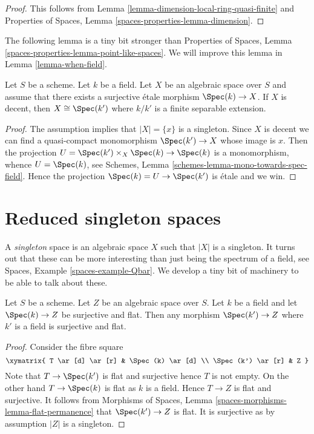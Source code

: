 \begin{proof}
This follows from Lemma \ref{lemma-dimension-local-ring-quasi-finite}
and Properties of Spaces, Lemma \ref{spaces-properties-lemma-dimension}.
\end{proof}

\noindent
The following lemma is a tiny bit stronger than
Properties of Spaces,
Lemma \ref{spaces-properties-lemma-point-like-spaces}.
We will improve this lemma in Lemma \ref{lemma-when-field}.

\begin{lemma}
\label{lemma-decent-point-like-spaces}
Let $S$ be a scheme. Let $k$ be a field. Let $X$ be an algebraic space
over $S$ and assume that there exists a surjective \'etale morphism
$\Spec(k) \to X$. If $X$ is decent, then $X \cong \Spec(k')$
where $k/k'$ is a finite separable extension.
\end{lemma}

\begin{proof}
The assumption implies that $|X| = \{x\}$ is a singleton. Since
$X$ is decent we can find a quasi-compact monomorphism $\Spec(k') \to X$
whose image is $x$. Then the projection
$U = \Spec(k') \times_X \Spec(k) \to \Spec(k)$
is a monomorphism, whence $U = \Spec(k)$, see
Schemes, Lemma \ref{schemes-lemma-mono-towards-spec-field}.
Hence the projection $\Spec(k) = U \to \Spec(k')$ is \'etale and
we win.
\end{proof}






\section{Reduced singleton spaces}
\label{section-singleton}

\noindent
A {\it singleton} space is an algebraic space $X$ such that $|X|$ is
a singleton. It turns out that these can be more interesting than
just being the spectrum of a field, see
Spaces, Example \ref{spaces-example-Qbar}.
We develop a tiny bit of machinery to be able to talk about these.

\begin{lemma}
\label{lemma-flat-cover-by-field}
Let $S$ be a scheme. Let $Z$ be an algebraic space over $S$.
Let $k$ be a field and let $\Spec(k) \to Z$ be surjective and flat.
Then any morphism $\Spec(k') \to Z$ where $k'$ is a field is
surjective and flat.
\end{lemma}

\begin{proof}
Consider the fibre square
$$
\xymatrix{
T \ar[d] \ar[r] & \Spec(k) \ar[d] \\
\Spec(k') \ar[r] & Z
}
$$
Note that $T \to \Spec(k')$ is flat and surjective hence $T$
is not empty. On the other hand $T \to \Spec(k)$ is flat as
$k$ is a field. Hence $T \to Z$ is flat and surjective.
It follows from
Morphisms of Spaces, Lemma \ref{spaces-morphisms-lemma-flat-permanence}
that $\Spec(k') \to Z$ is flat. It is surjective as by assumption
$|Z|$ is a singleton.
\end{proof}

